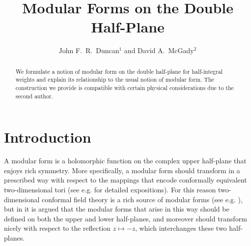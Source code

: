 \documentclass[aps,prd,groupedaddress,preprint,tightenlines,eqsecnum,nofootinbib]{revtex4}
\begin{document}

\titlepage

\title{Modular Forms on the Double Half-Plane}

\author{John F.~R.~Duncan$^1$ and David A.~McGady$^2$}



\begin{abstract}
We formulate a notion of modular form on the double half-plane for half-integral weights and explain its relationship to the usual notion of modular form. The construction we provide is compatible with certain physical considerations due to the second author. 
\end{abstract}

\maketitle



\section{Introduction}\label{sec:intro}


A modular form is a holomorphic function on the complex upper half-plane that enjoys rich symmetry. More specifically, a modular form should transform in a prescribed way with respect to the mappings that encode conformally equivalent two-dimensional tori (see e.g. \cite{01-Apostol, 02-Serre, 03-Knapp} for detailed expositions). For this reason two-dimensional conformal field theory is a rich source of modular forms (see e.g. \cite{04-Yellow, 05-PolchinskiI}), but in \cite{06T-rex2} it is argued that the modular forms that arise in this way should be defined on both the upper and lower half-planes, and moreover should transform nicely with respect to the reflection $z\mapsto -z$, which interchanges these two half-planes. 
\end{document}
